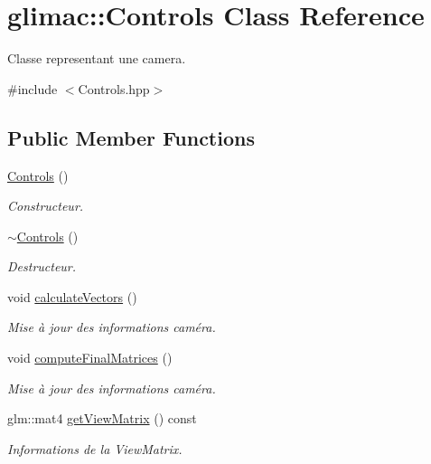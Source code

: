 \hypertarget{classglimac_1_1Controls}{}\section{glimac\+:\+:Controls Class Reference}
\label{classglimac_1_1Controls}


Classe representant une camera.  




{\ttfamily \#include $<$Controls.\+hpp$>$}

\subsection*{Public Member Functions}
\begin{DoxyCompactItemize}
\item 
\hyperlink{classglimac_1_1Controls_a79e53d145de5f030bf72689db7bc928c}{Controls} ()
\begin{DoxyCompactList}\small\item\em Constructeur. \end{DoxyCompactList}\item 
\hyperlink{classglimac_1_1Controls_ac2fdd147ad3c35e410b70a58559544e3}{$\sim$\+Controls} ()
\begin{DoxyCompactList}\small\item\em Destructeur. \end{DoxyCompactList}\item 
void \hyperlink{classglimac_1_1Controls_a1937e9b03344764ec2bb608cf5d42f20}{calculate\+Vectors} ()
\begin{DoxyCompactList}\small\item\em Mise à jour des informations caméra. \end{DoxyCompactList}\item 
void \hyperlink{classglimac_1_1Controls_a03104d031d93fdb96ab945d385ecdca0}{compute\+Final\+Matrices} ()
\begin{DoxyCompactList}\small\item\em Mise à jour des informations caméra. \end{DoxyCompactList}\item 
glm\+::mat4 \hyperlink{classglimac_1_1Controls_ad2103ef89a2a4166dea80fa11480c324}{get\+View\+Matrix} () const
\begin{DoxyCompactList}\small\item\em Informations de la View\+Matrix. \end{DoxyCompactList}\item 

\end{DoxyCompactItemize}
